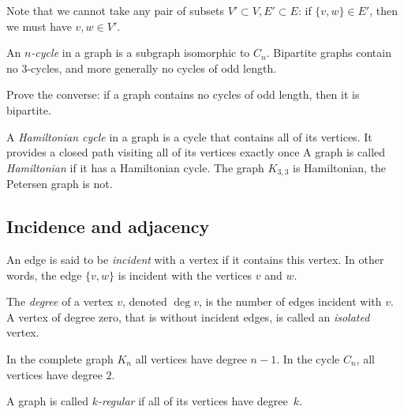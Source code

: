 \begin{page}

Note that we cannot take any pair of subsets $V' \subset V, E' \subset E$:
if $\{v, w\} \in E'$, then we must have $v, w \in V'$.

An \emph{$n$-cycle} in a graph is a subgraph isomorphic to $C_n$.
Bipartite graphs contain no $3$-cycles, and more generally no cycles of odd length.

\begin{exc}
Prove the converse: if a graph contains no cycles of odd length, then it is bipartite.
\end{exc}

A \emph{Hamiltonian cycle} in a graph is a cycle that contains all of its vertices.
It provides a closed path visiting all of its vertices exactly once
A graph is called \emph{Hamiltonian} if it has a Hamiltonian cycle.
The graph $K_{3,3}$ is Hamiltonian, the Petersen graph is not.




\end{page}

\begin{page}

\subsection{Incidence and adjacency}
An edge is said to be \emph{incident} with a vertex if it contains this vertex.
In other words, the edge $\{v, w\}$ is incident with the vertices $v$ and $w$.

The \emph{degree} of a vertex $v$, denoted $\deg v$, is the number of edges incident with $v$.
A vertex of degree zero, that is without incident edges, is called an \emph{isolated} vertex.

In the complete graph $K_n$ all vertices have degree $n-1$.
In the cycle $C_n$, all vertices have degree $2$.


\end{page}

\begin{page}

\begin{dfn}
A graph is called \emph{$k$-regular} if all of its vertices have degree~$k$.
\end{dfn}

\end{page}

